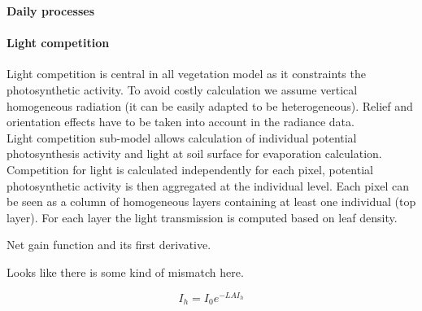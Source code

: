 \documentclass[a4paper,twoside, justified,marginals=raggedright]{tufte-handout}
\begin{document}
\textbf{Daily processes}\\

\paragraph{Light competition}Light competition is central in all vegetation model as it constraints the photosynthetic activity. To avoid costly calculation we assume vertical homogeneous radiation (it can be easily adapted to be heterogeneous). Relief and orientation effects have to be taken into account in the radiance data.\\
Light competition sub-model allows calculation of individual potential photosynthesis activity and light at soil surface for evaporation calculation.\\
Competition for light is calculated independently for each pixel, potential photosynthetic activity is then aggregated at the individual level. Each pixel can be seen as a column of homogeneous layers containing at least one individual (top layer). For each layer the light transmission is computed based on leaf density.


\begin{marginfigure}
\label{fig:derivaives}
\caption{Net gain function and its first derivative.} Looks like there is some kind of mismatch here.
\end{marginfigure}

\begin{equation}\label{eq:Ih}
I_{h} =  I_{0} e^{-LAI_{h}}
\end{equation}
\end{document}
